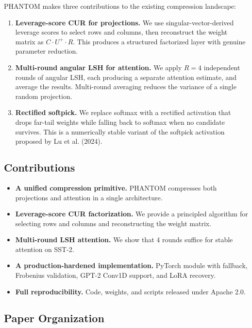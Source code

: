 PHANTOM makes three contributions to the existing compression landscape:

\begin{enumerate}
\item \textbf{Leverage-score CUR for projections.} We use singular-vector-derived
  leverage scores to select rows and columns, then reconstruct the weight
  matrix as $C \cdot U^+ \cdot R$. This produces a structured factorized
  layer with genuine parameter reduction.

\item \textbf{Multi-round angular LSH for attention.} We apply $R = 4$ independent
  rounds of angular LSH, each producing a separate attention estimate, and
  average the results. Multi-round averaging reduces the variance of a single
  random projection.

\item \textbf{Rectified softpick.} We replace softmax with a rectified activation
  that drops far-tail weights while falling back to softmax when no candidate
  survives. This is a numerically stable variant of the softpick activation
  proposed by Lu et al. (2024).

\end{enumerate}
\subsection{Contributions}

\begin{itemize}
\item \textbf{A unified compression primitive.} PHANTOM compresses both projections
  and attention in a single architecture.
\item \textbf{Leverage-score CUR factorization.} We provide a principled algorithm for
  selecting rows and columns and reconstructing the weight matrix.
\item \textbf{Multi-round LSH attention.} We show that 4 rounds suffice for stable
  attention on SST-2.
\item \textbf{A production-hardened implementation.} PyTorch module with fallback,
  Frobenius validation, GPT-2 Conv1D support, and LoRA recovery.
\item \textbf{Full reproducibility.} Code, weights, and scripts released under Apache 2.0.

\end{itemize}
\subsection{Paper Organization}

